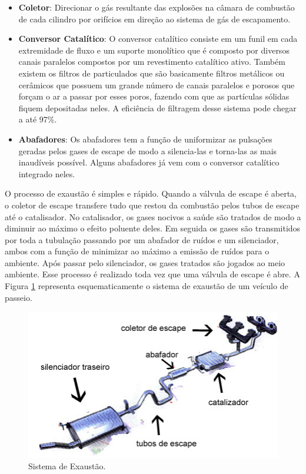 \begin{itemize}
	\item \textbf{Coletor}: Direcionar o gás resultante das explosões na câmara de combustão de cada cilindro por orifícios em direção ao sistema de gás de escapamento.
	\item \textbf{Conversor Catalítico}: O conversor catalítico consiste em um funil em cada extremidade de fluxo e um suporte monolítico que é composto por diversos canais paralelos compostos por um revestimento catalítico ativo. Também existem os filtros de particulados que são basicamente filtros metálicos ou cerâmicos que possuem um grande número de canais paralelos e porosos que forçam o ar a passar por esses poros, fazendo com que as partículas sólidas fiquem depositadas neles. A eficiência de filtragem desse sistema pode chegar a até 97\%.
	\item \textbf{Abafadores}: Os abafadores tem a função de uniformizar as pulsações geradas pelos gases de escape de modo a silencia-las e torna-las as mais inaudíveis possível. Alguns abafadores já vem com o conversor catalítico integrado neles.
\end{itemize}

	O processo de exaustão é simples e rápido. Quando a válvula de escape é aberta, o coletor de escape transfere tudo que restou da combustão pelos tubos de escape até o catalisador. No catalisador, os gases nocivos a saúde são tratados de modo a diminuir ao máximo o efeito poluente deles. Em seguida os gases são transmitidos por toda a tubulação passando por um abafador de ruídos e um silenciador, ambos com a função de minimizar ao máximo a emissão de ruídos para o ambiente. Após passar pelo silenciador, os gases tratados são jogados ao meio ambiente. Esse processo é realizado toda vez que uma válvula de escape é abre. A Figura \ref{fig:sistemaexaustao} representa esquematicamente o sistema de exaustão de um veículo de passeio.
	
\begin{figure}[h!]
	\centering
	\includegraphics[keepaspectratio=true,scale= 0.7]{figuras/sistemaexaustao.png}
	\caption{Sistema de Exaustão.}
	\label{fig:sistemaexaustao}
\end{figure}


